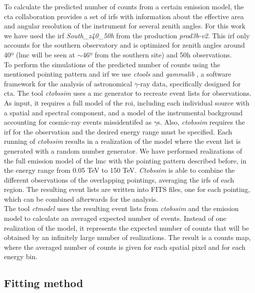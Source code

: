 \documentclass[main.tex]{subfiles}
\begin{document}
To calculate the predicted number of counts from a certain emission model, the \gls{cta} collaboration provides a set of \glspl{irf} \cite{CTAPerformance} with information about the effective area and angular resolution of the instrument for several zenith angles. For this work we have used the \gls{irf} \textit{South\_z40\_50h} from the production \textit{prod3b-v2}. This \gls{irf} only accounts for the southern observatory and is optimized for zenith angles around 40º (\gls{lmc} will be seen at $\sim 46$º from the southern site) and 50h observations. \\
To perform the simulations of the predicted number of counts using the mentioned pointing pattern and \gls{irf} we use \textit{ctools} and \textit{gammalib} \cite{2016Actools}, a software framework for the analysis of astronomical $\gamma$-ray data, specifically designed for \gls{cta}. The tool \textit{ctobssim} uses a \gls{mc} generator to recreate event lists for observations. As input, it requires a full model of the \gls{roi}, including each individual source with a spatial and spectral component, and a model of the instrumental background accounting for cosmic-ray events missidentifed as $\gamma$s.
Also, \textit{ctobssim} requires the \gls{irf} for the observation and the desired energy range must be specified. Each running of \textit{ctobssim} results in a realization of the model where the event list is generated with a random number generator. We have performed realizations of the full emission model of the \gls{lmc} with the pointing pattern described before, in the energy range from 0.05 TeV to 150 TeV. \textit{Ctobssim} is able to combine the different observations of the overlapping pointings, averaging the \glspl{irf} of each region. The resulting event lists are written into FITS files, one for each pointing, which can be combined afterwards for the analysis.\\
The tool \textit{ctmodel} uses the resulting event lists from \textit{ctobssim} and the emission model to calculate an averaged expected number of events. Instead of one realization of the model, it represents the expected number of counts that will be obtained by an infinitely large number of realizations. The result is a counts map, where the averaged number of counts is given for each spatial pixel and for each energy bin. 
    
\subsection{Fitting method}
\end{document}
